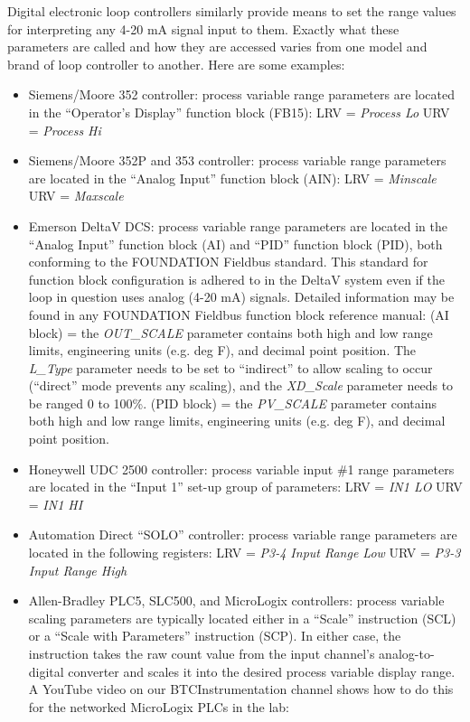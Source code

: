 \vskip 10pt

\filbreak

Digital electronic loop controllers similarly provide means to set the range values for interpreting any 4-20 mA signal input to them.  Exactly what these parameters are called and how they are accessed varies from one model and brand of loop controller to another.  Here are some examples:

\begin{itemize}
\item{} Siemens/Moore 352 controller: process variable range parameters are located in the ``Operator's Display'' function block (FB15):
\itemitem{} LRV = {\it Process Lo}
\itemitem{} URV = {\it Process Hi}
\vskip 10pt
\item{} Siemens/Moore 352P and 353 controller: process variable range parameters are located in the ``Analog Input'' function block (AIN):
\itemitem{} LRV = {\it Minscale}
\itemitem{} URV = {\it Maxscale}
\vskip 10pt
\item{} Emerson DeltaV DCS: process variable range parameters are located in the ``Analog Input'' function block (AI) and ``PID'' function block (PID), both conforming to the FOUNDATION Fieldbus standard.  This standard for function block configuration is adhered to in the DeltaV system even if the loop in question uses analog (4-20 mA) signals.  Detailed information may be found in any FOUNDATION Fieldbus function block reference manual:
\itemitem{} (AI block) = the {\it OUT\_SCALE} parameter contains both high and low range limits, engineering units (e.g. deg F), and decimal point position.  The {\it L\_Type} parameter needs to be set to ``indirect'' to allow scaling to occur (``direct'' mode prevents any scaling), and the {\it XD\_Scale} parameter needs to be ranged 0 to 100\%.
\itemitem{} (PID block) = the {\it PV\_SCALE} parameter contains both high and low range limits, engineering units (e.g. deg F), and decimal point position.
\vskip 10pt
\item{} Honeywell UDC 2500 controller: process variable input \#1 range parameters are located in the ``Input 1'' set-up group of parameters:
\itemitem{} LRV = {\it IN1 LO}
\itemitem{} URV = {\it IN1 HI}
\vskip 10pt
\item{} Automation Direct ``SOLO'' controller: process variable range parameters are located in the following registers:
\itemitem{} LRV = {\it P3-4 Input Range Low}
\itemitem{} URV = {\it P3-3 Input Range High}
\vskip 10pt
\item{} Allen-Bradley PLC5, SLC500, and MicroLogix controllers: process variable scaling parameters are typically located either in a ``Scale'' instruction (SCL) or a ``Scale with Parameters'' instruction (SCP).  In either case, the instruction takes the raw count value from the input channel's analog-to-digital converter and scales it into the desired process variable display range.  A YouTube video on our BTCInstrumentation channel shows how to do this for the networked MicroLogix PLCs in the lab:

\end{itemize}
